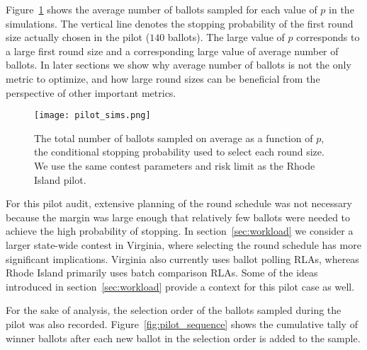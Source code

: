 Figure~\ref{fig:pilot_sims} shows the average number of ballots sampled for each value of $p$ in the simulations. The vertical line denotes the stopping probability of the first round size actually chosen in the pilot ($140$ ballots). The large value of $p$ corresponds to a large first round size and a corresponding large value of average number of ballots. In later sections we show why average number of ballots is not the only metric to optimize, and how large round sizes can be beneficial from the perspective of other important metrics. 

\begin{figure}[h!]
\texttt{[image: pilot\_sims.png]}
\caption{The total number of ballots sampled on average as a function of $p$, the conditional stopping probability used to select each round size. We use the same contest parameters and risk limit as the Rhode Island pilot.}
\label{fig:pilot_sims}
\end{figure}

For this pilot audit, extensive planning of the round schedule was not necessary because the margin was large enough that relatively few ballots were needed to achieve the high probability of stopping. In section~\ref{sec:workload} we consider a larger state-wide contest in Virginia, where selecting the round schedule has more significant implications. Virginia also currently uses ballot polling RLAs, whereas Rhode Island primarily uses batch comparison RLAs. Some of the ideas introduced in section~\ref{sec:workload} provide a context for this pilot case as well.

For the sake of analysis, the selection order of the ballots sampled during the pilot was also recorded. Figure~\ref{fig:pilot_sequence} shows the cumulative tally of winner ballots after each new ballot in the selection order is added to the sample. 

